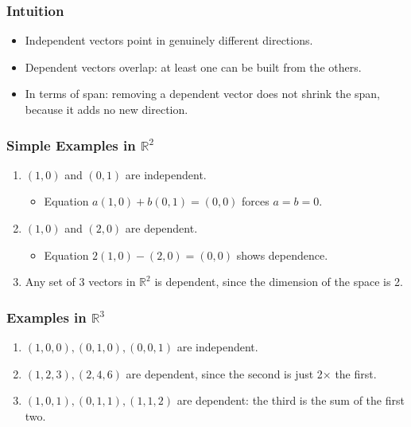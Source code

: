 \documentclass[
  letterpaper,
  DIV=11,
  numbers=noendperiod]{scrreprt}
\providecommand{\tightlist}{%
  \setlength{\itemsep}{0pt}\setlength{\parskip}{0pt}}
\begin{document}
\subsubsection{Intuition}\label{intuition-1}

\begin{itemize}
\tightlist
\item
  Independent vectors point in genuinely different directions.
\item
  Dependent vectors overlap: at least one can be built from the others.
\item
  In terms of span: removing a dependent vector does not shrink the
  span, because it adds no new direction.
\end{itemize}

\subsubsection{\texorpdfstring{Simple Examples in
\(\mathbb{R}^2\)}{Simple Examples in \textbackslash mathbb\{R\}\^{}2}}\label{simple-examples-in-mathbbr2}

\begin{enumerate}
\def\labelenumi{\arabic{enumi}.}
\item
  \((1,0)\) and \((0,1)\) are independent.

  \begin{itemize}
  \tightlist
  \item
    Equation \(a(1,0) + b(0,1) = (0,0)\) forces \(a = b = 0\).
  \end{itemize}
\item
  \((1,0)\) and \((2,0)\) are dependent.

  \begin{itemize}
  \tightlist
  \item
    Equation \(2(1,0) - (2,0) = (0,0)\) shows dependence.
  \end{itemize}
\item
  Any set of 3 vectors in \(\mathbb{R}^2\) is dependent, since the
  dimension of the space is 2.
\end{enumerate}

\subsubsection{\texorpdfstring{Examples in
\(\mathbb{R}^3\)}{Examples in \textbackslash mathbb\{R\}\^{}3}}\label{examples-in-mathbbr3}

\begin{enumerate}
\def\labelenumi{\arabic{enumi}.}
\tightlist
\item
  \((1,0,0), (0,1,0), (0,0,1)\) are independent.
\item
  \((1,2,3), (2,4,6)\) are dependent, since the second is just 2× the
  first.
\item
  \((1,0,1), (0,1,1), (1,1,2)\) are dependent: the third is the sum of
  the first two.
\end{enumerate}
\end{document}
